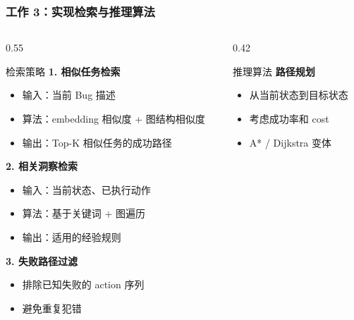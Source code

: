 \documentclass[aspectratio=169,10pt]{beamer}
\begin{document}
\begin{frame}
  \frametitle{工作 3：实现检索与推理算法}

  \begin{columns}[T]
    \begin{column}{0.55\textwidth}
      \begin{block}{检索策略}
        \footnotesize
        \textbf{1. 相似任务检索}
        \begin{itemize}
          \item 输入：当前 Bug 描述
          \item 算法：embedding 相似度 + 图结构相似度
          \item 输出：Top-K 相似任务的成功路径
        \end{itemize}

        \vspace{0.2cm}

        \textbf{2. 相关洞察检索}
        \begin{itemize}
          \item 输入：当前状态、已执行动作
          \item 算法：基于关键词 + 图遍历
          \item 输出：适用的经验规则
        \end{itemize}

        \vspace{0.2cm}

        \textbf{3. 失败路径过滤}
        \begin{itemize}
          \item 排除已知失败的 action 序列
          \item 避免重复犯错
        \end{itemize}
      \end{block}
    \end{column}

    \begin{column}{0.42\textwidth}
      \begin{block}{推理算法}
        \footnotesize
        \textbf{路径规划}
        \begin{itemize}
          \item 从当前状态到目标状态
          \item 考虑成功率和 cost
          \item A* / Dijkstra 变体
        \end{itemize}

        \vspace{0.2cm}


\end{block}
\end{column}
\end{columns}
\end{frame}
\end{document}

